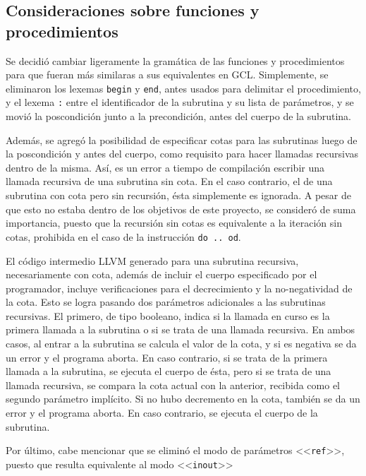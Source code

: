 \subsection{Consideraciones sobre funciones y procedimientos}

Se decidió cambiar ligeramente la gramática de las funciones y procedimientos
para que fueran más similaras a sus equivalentes en GCL. Simplemente, se
eliminaron los lexemas \texttt{begin} y \texttt{end}, antes usados para
delimitar el procedimiento, y el lexema \texttt{:} entre el identificador de la
subrutina y su lista de parámetros, y se movió la poscondición junto a la
precondición, antes del cuerpo de la subrutina.

Además, se agregó la posibilidad de especificar cotas para las subrutinas luego
de la poscondición y antes del cuerpo, como requisito para hacer llamadas
recursivas dentro de la misma. Así, es un error a tiempo de compilación escribir
una llamada recursiva de una subrutina sin cota. En el caso contrario, el de una
subrutina con cota pero sin recursión, ésta simplemente es ignorada. A pesar de
que esto no estaba dentro de los objetivos de este proyecto, se consideró de
suma importancia, puesto que la recursión sin cotas es equivalente a la
iteración sin cotas, prohibida en el caso de la instrucción \texttt{do .. od}.

El código intermedio LLVM generado para una subrutina recursiva, necesariamente
con cota, además de incluir el cuerpo especificado por el programador, incluye
verificaciones para el decrecimiento y la no-negatividad de la cota. Esto se
logra pasando dos parámetros adicionales a las subrutinas recursivas. El
primero, de tipo booleano, indica si la llamada en curso es la primera llamada a
la subrutina o si se trata de una llamada recursiva. En ambos casos, al entrar a
la subrutina se calcula el valor de la cota, y si es negativa se da un error y
el programa aborta. En caso contrario, si se trata de la primera llamada a la
subrutina, se ejecuta el cuerpo de ésta, pero si se trata de una llamada
recursiva, se compara la cota actual con la anterior, recibida como el segundo
parámetro implícito. Si no hubo decremento en la cota, también se da un error y
el programa aborta. En caso contrario, se ejecuta el cuerpo de la subrutina.

Por último, cabe mencionar que se eliminó el modo de parámetros
<<\texttt{ref}>>, puesto que resulta equivalente al modo <<\texttt{inout}>>

